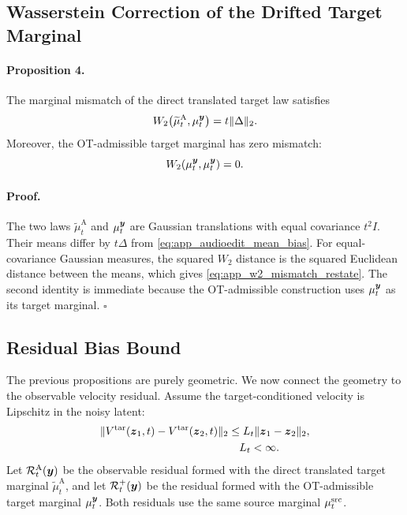 \subsection{Wasserstein Correction of the Drifted Target Marginal}

\paragraph{Proposition 4.}
The marginal mismatch of the direct translated target law satisfies
\begin{equation}
    \label{eq:app_w2_mismatch_restate}
    W_2\!\left(
    \widetilde{\mu}^{\mathrm{A}}_t,
    \mu_t^{\boldsymbol{y}}
    \right)
    =
    t\|\Delta\|_2.
\end{equation}
Moreover, the OT-admissible target marginal has zero mismatch:
\begin{equation}
    \label{eq:app_plus_zero_mismatch}
    W_2\!\left(
    \mu_t^{\boldsymbol{y}},
    \mu_t^{\boldsymbol{y}}
    \right)
    =
    0.
\end{equation}

\paragraph{Proof.}
The two laws $\widetilde{\mu}^{\mathrm{A}}_t$ and $\mu_t^{\boldsymbol{y}}$ are Gaussian translations with equal covariance $t^2I$.
Their means differ by $t\Delta$ from \eqref{eq:app_audioedit_mean_bias}.
For equal-covariance Gaussian measures, the squared $W_2$ distance is the squared Euclidean distance between the means, which gives \eqref{eq:app_w2_mismatch_restate}.
The second identity is immediate because the OT-admissible construction uses $\mu_t^{\boldsymbol{y}}$ as its target marginal.
\hfill$\square$

\subsection{Residual Bias Bound}

The previous propositions are purely geometric.
We now connect the geometry to the observable velocity residual.
Assume the target-conditioned velocity is Lipschitz in the noisy latent:
\begin{equation}
    \label{eq:app_lipschitz_assumption}
    \begin{aligned}
    \|V^{\mathrm{tar}}(\boldsymbol{z}_1,t)-V^{\mathrm{tar}}(\boldsymbol{z}_2,t)\|_2
    &\le
    L_t\|\boldsymbol{z}_1-\boldsymbol{z}_2\|_2,
    \\
    &\hspace{1.0em}L_t<\infty.
    \end{aligned}
\end{equation}
Let $\mathcal{R}_t^{\mathrm{A}}(\boldsymbol{y})$ be the observable residual formed with the direct translated target marginal $\widetilde{\mu}^{\mathrm{A}}_t$, and let $\mathcal{R}_t^{+}(\boldsymbol{y})$ be the residual formed with the OT-admissible target marginal $\mu_t^{\boldsymbol{y}}$.
Both residuals use the same source marginal $\mu_t^{\mathrm{src}}$.

